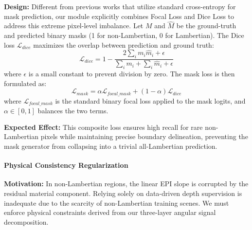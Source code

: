 \documentclass[lettersize,journal]{IEEEtran}
\begin{document}
\textbf{Design:} Different from previous works that utilize standard cross-entropy for mask prediction, our module explicitly combines Focal Loss and Dice Loss to address this extreme pixel-level imbalance. Let $M$ and $\hat{M}$ be the ground-truth and predicted binary masks (1 for non-Lambertian, 0 for Lambertian). The Dice loss $\mathcal{L}_{dice}$ maximizes the overlap between prediction and ground truth:
\begin{equation} \label{eq:ch3_20}
\mathcal{L}_{dice} = 1 - \frac{2 \sum_{i} m_i \hat{m}_i + \epsilon}{\sum_{i} m_i + \sum_{i} \hat{m}_i + \epsilon}
\end{equation}
where $\epsilon$ is a small constant to prevent division by zero. The mask loss is then formulated as:
\begin{equation} \label{eq:ch3_21}
\mathcal{L}_{mask} = \alpha \mathcal{L}_{focal\_mask} + (1 - \alpha) \mathcal{L}_{dice}
\end{equation}
where $\mathcal{L}_{focal\_mask}$ is the standard binary focal loss applied to the mask logits, and $\alpha \in [0, 1]$ balances the two terms. 

\textbf{Expected Effect:} This composite loss ensures high recall for rare non-Lambertian pixels while maintaining precise boundary delineation, preventing the mask generator from collapsing into a trivial all-Lambertian prediction.

\paragraph{Physical Consistency Regularization}
\textbf{Motivation:} In non-Lambertian regions, the linear EPI slope is corrupted by the residual material component. Relying solely on data-driven depth supervision is inadequate due to the scarcity of non-Lambertian training scenes. We must enforce physical constraints derived from our three-layer angular signal decomposition.
\end{document}
